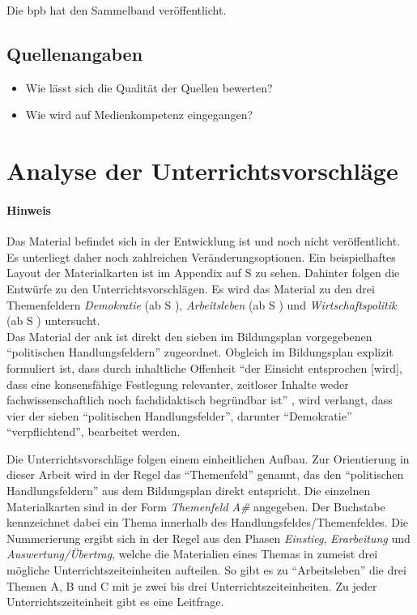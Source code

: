Die \gls{bpb} hat den Sammelband veröffentlicht.
\subsection{Quellenangaben}
\begin{itemize}
    \item Wie lässt sich die Qualität der Quellen bewerten?
    \item Wie wird auf Medienkompetenz eingegangen?
 \end{itemize}




\section{Analyse der Unterrichtsvorschläge \label{Analyse}}
\paragraph{Hinweis}
Das Material befindet sich in der Entwicklung ist und noch nicht veröffentlicht. Es unterliegt daher noch zahlreichen Veränderungsoptionen. 
Ein beispielhaftes Layout der Materialkarten ist im Appendix auf \acrlong{S} \pageref{ANKPrototyp} zu sehen. Dahinter folgen die Entwürfe zu den Unterrichtsvorschlägen.
Es wird das Material zu den drei Themenfeldern \emph{Demokratie} (ab \gls{S} \pageref{DEMOKRATIE-A1}), \emph{Arbeitsleben} (ab \gls{S} \pageref{ARBEITSLEBEN-A1}) und \emph{Wirtschaftspolitik} (ab \gls{S} \pageref{WIRTSCHAFTSPOLITIK-A1}) untersucht. \\


Das Material der \gls{ank} ist direkt den sieben im Bildungsplan vorgegebenen \enquote{politischen Handlungsfeldern} \autocite[3, 15]{bplan} zugeordnet.
Obgleich im Bildungsplan explizit formuliert ist, dass durch inhaltliche Offenheit \enquote{der Einsicht entsprochen [wird], dass eine konsensfähige Festlegung relevanter, zeitloser Inhalte weder fachwissenschaftlich noch fachdidaktisch begründbar ist} \autocite[15]{bplan}, wird verlangt, dass vier der sieben \enquote{politischen Handlungsfelder}, darunter \enquote{Demokratie} \enquote{verpflichtend}, bearbeitet werden.

Die Unterrichtsvorschläge folgen einem einheitlichen Aufbau. Zur Orientierung in dieser Arbeit wird in der Regel das \enquote{Themenfeld} genannt, das den \enquote{politischen Handlungsfeldern} aus dem Bildungsplan direkt entspricht. 
Die einzelnen Materialkarten sind in der Form \emph{Themenfeld A\#} angegeben. 
Der Buchstabe kennzeichnet dabei ein Thema innerhalb des Handlungsfeldes/Themenfeldes.
Die Nummerierung ergibt sich in der Regel aus den Phasen \emph{Einstieg}, \emph{Erarbeitung} und \emph{Auswertung/Übertrag}, welche die Materialien eines Themas in zumeist drei mögliche Unterrichtszeiteinheiten aufteilen. So gibt es zu \enquote{Arbeitsleben} die drei Themen A, B und C mit je zwei bis drei Unterrichtszeiteinheiten.
Zu jeder Unterrichtszeiteinheit gibt es eine Leitfrage. %

